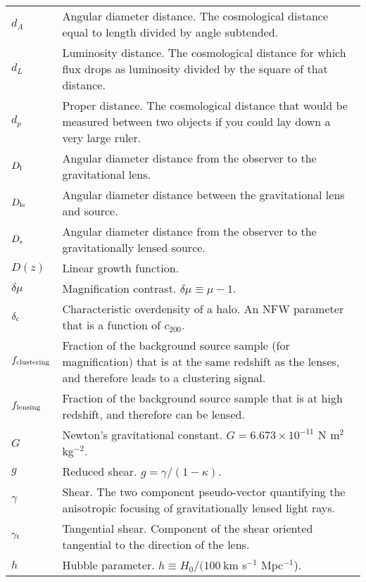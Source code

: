 \section*{\underline{}}
\vspace{-0.5cm}
\begin{tabular}{p{0.6in}p{5.8in}}

$d_A$ & Angular diameter distance. The cosmological distance equal to length divided by angle subtended. \\
$d_L$ & Luminosity distance. The cosmological distance for which flux drops as luminosity divided by the square of that distance. \\
$d_p$ & Proper distance. The cosmological distance that would be measured between two objects if you could lay down a very large ruler. \\
$D_{\rm l}$ & Angular diameter distance from the observer to the gravitational lens. \\
$D_{\rm ls}$ & Angular diameter distance between the gravitational lens and source. \\
$D_{\rm s}$ & Angular diameter distance from the observer to the gravitationally lensed source. \\
$D(z)$ & Linear growth function. \\
$\delta\mu$ & Magnification contrast. $\delta\mu \equiv \mu -1$. \\
$\delta_{\rm c}$ & Characteristic overdensity of a halo. An \acs{NFW} parameter that is a function of $c_{200}$. \\
$f_{\rm clustering}$ & Fraction of the background source sample (for magnification) that is at the same redshift as the lenses, and therefore leads to a clustering signal. \\
$f_{\rm lensing}$ & Fraction of the background source sample that is at high redshift, and therefore can be lensed. \\
$G$ & Newton's gravitational constant. $G = 6.673 \times 10^{-11}$ N m$^2$ kg$^{-2}$.\\
$g$ & Reduced shear. $g = \gamma/(1-\kappa)$. \\
$\gamma$ & Shear. The two component pseudo-vector quantifying the anisotropic focusing of gravitationally lensed light rays. \\
$\gamma_{\rm t}$ & Tangential shear. Component of the shear oriented tangential to the direction of the lens. \\
$h$ & Hubble parameter. $h \equiv H_0/(100\ $km s$^{-1}$ Mpc$^{-1}$). \\

\end{tabular}

